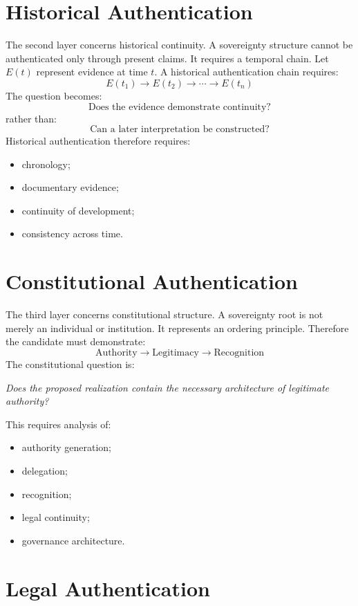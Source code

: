 \documentclass[11pt,openany]{book}
\theoremstyle{plain}
\theoremstyle{definition}
\begin{document}
\section{Historical Authentication}

The second layer concerns historical continuity. A sovereignty structure cannot be authenticated only through present claims. It requires a temporal chain. Let \(E(t)\) represent evidence at time \(t\). A historical authentication chain requires:
\[
E(t_1) \longrightarrow E(t_2) \longrightarrow \cdots \longrightarrow E(t_n)
\]
The question becomes:
\[
\text{Does the evidence demonstrate continuity?}
\]
rather than:
\[
\text{Can a later interpretation be constructed?}
\]
Historical authentication therefore requires:
\begin{itemize}
\item chronology;
\item documentary evidence;
\item continuity of development;
\item consistency across time.
\end{itemize}

\section{Constitutional Authentication}

The third layer concerns constitutional structure. A sovereignty root is not merely an individual or institution. It represents an ordering principle. Therefore the candidate must demonstrate:
\[
\text{Authority} \longrightarrow \text{Legitimacy} \longrightarrow \text{Recognition}
\]
The constitutional question is:
\begin{center}
\textit{
Does the proposed realization contain the necessary architecture of legitimate authority?
}
\end{center}
This requires analysis of:
\begin{itemize}
\item authority generation;
\item delegation;
\item recognition;
\item legal continuity;
\item governance architecture.
\end{itemize}

\section{Legal Authentication}
\end{document}
